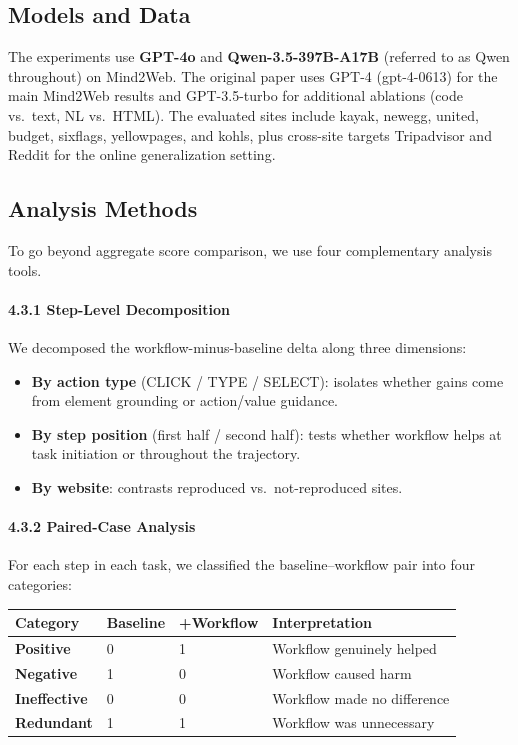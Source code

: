 \documentclass{article}
\providecommand{\tightlist}{%
  \setlength{\itemsep}{0pt}\setlength{\parskip}{0.8em}}
\begin{document}
\subsection{Models and Data}\label{models-and-data}

The experiments use \textbf{GPT-4o} and \textbf{Qwen-3.5-397B-A17B}
(referred to as Qwen throughout) on Mind2Web. The original paper uses
GPT-4 (gpt-4-0613) for the main Mind2Web results and GPT-3.5-turbo for
additional ablations (code vs.\ text, NL vs.\ HTML). The evaluated sites
include kayak, newegg, united, budget, sixflags, yellowpages, and
kohls, plus cross-site targets Tripadvisor and Reddit for the online
generalization setting.

\subsection{Analysis Methods}\label{analysis-methods}

To go beyond aggregate score comparison, we use four complementary
analysis tools.

\paragraph{4.3.1 Step-Level
Decomposition}\label{step-level-decomposition}

We decomposed the workflow-minus-baseline delta along three dimensions:

\begin{itemize}
\tightlist
\item
  \textbf{By action type} (CLICK / TYPE / SELECT): isolates whether
  gains come from element grounding or action/value guidance.
\item
  \textbf{By step position} (first half / second half): tests whether
  workflow helps at task initiation or throughout the trajectory.
\item
  \textbf{By website}: contrasts reproduced vs.~not-reproduced sites.
\end{itemize}

\paragraph{4.3.2 Paired-Case Analysis}\label{paired-case-analysis}

For each step in each task, we classified the baseline--workflow pair
into four categories:

{\begin{longtable}[]{@{}llll@{}}
\toprule\noalign{}
Category & Baseline & +Workflow & Interpretation \\
\midrule\noalign{}
\endhead
\bottomrule\noalign{}
\endlastfoot
\textbf{Positive} & 0 & 1 & Workflow genuinely helped \\
\textbf{Negative} & 1 & 0 & Workflow caused harm \\
\textbf{Ineffective} & 0 & 0 & Workflow made no difference \\
\textbf{Redundant} & 1 & 1 & Workflow was unnecessary \\
\end{longtable}
}
\end{document}

